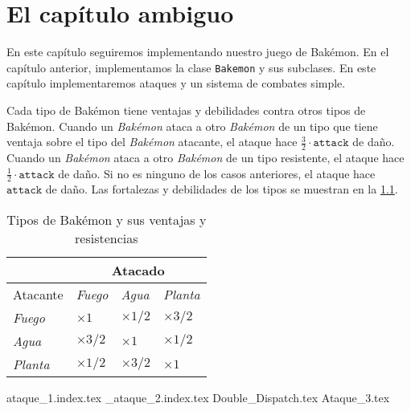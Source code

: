 \chapter{El capítulo ambiguo}
  \label{chap:ambiguo}
    
  En este capítulo seguiremos implementando nuestro juego de Bakémon.
  En el capítulo anterior, implementamos la clase \texttt{Bakemon} y sus subclases.
  En este capítulo implementaremos ataques y un sistema de combates simple.

  Cada tipo de Bakémon tiene ventajas y debilidades contra otros tipos de Bakémon.
  Cuando un \textit{Bakémon} ataca a otro \textit{Bakémon} de un tipo que tiene ventaja
  sobre el tipo del \textit{Bakémon} atacante, el ataque hace 
  \(\frac{3}{2} \cdot \mathtt{attack}\) de daño.
  Cuando un \textit{Bakémon} ataca a otro \textit{Bakémon} de un tipo resistente, el ataque
  hace \(\frac{1}{2} \cdot \mathtt{attack}\) de daño.
  Si no es ninguno de los casos anteriores, el ataque hace \(\mathtt{attack}\) de daño.
  Las fortalezas y debilidades de los tipos se muestran en la \cref{tab:tipos}.

  \begin{table}[ht!]
    \centering
    \begin{tabular}{ |p{2cm}|p{2cm}|p{2cm}|p{2cm}|  }
      \hline
                & \multicolumn{3}{|c|}{Atacado} \\
      \hline
      Atacante  & \textit{Fuego}              & \textit{Agua}           & \textit{Planta} \\
      \hline
      \textit{Fuego}  & \(\times 1\)           & \(\times 1/2\)         & \(\times 3/2\) \\
      \hline
      \textit{Agua}   & \(\times 3/2\)         & \(\times 1\)           & \(\times 1/2\) \\
      \hline
      \textit{Planta} & \(\times 1/2\)         & \(\times 3/2\)         & \(\times 1\) \\
      \hline
      \end{tabular}
    \caption{Tipos de Bakémon y sus ventajas y resistencias}
    \label{tab:tipos}
  \end{table}

  {ataque_1.index.tex}
  {_ataque_2.index.tex}
  {Double_Dispatch.tex}
  {Ataque_3.tex}
  
  \printbibliography[keyword=double-dispatch]